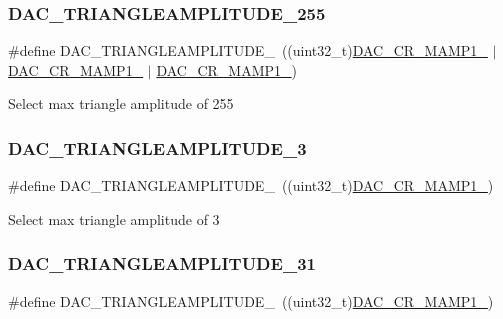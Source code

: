 \subsubsection{\texorpdfstring{DAC\_TRIANGLEAMPLITUDE\_255}{DAC\_TRIANGLEAMPLITUDE\_255}}
{\footnotesize\ttfamily \#define D\+A\+C\+\_\+\+T\+R\+I\+A\+N\+G\+L\+E\+A\+M\+P\+L\+I\+T\+U\+D\+E\+\_~((uint32\+\_\+t)\mbox{\hyperlink{group___peripheral___registers___bits___definition_ga0fefef1d798a2685b03e44bd9fdac06b}{D\+A\+C\+\_\+\+C\+R\+\_\+\+M\+A\+M\+P1\+\_}} $\vert$ \mbox{\hyperlink{group___peripheral___registers___bits___definition_ga6cc15817842cb7992d449c448684f68d}{D\+A\+C\+\_\+\+C\+R\+\_\+\+M\+A\+M\+P1\+\_}} $\vert$ \mbox{\hyperlink{group___peripheral___registers___bits___definition_ga4225dcce22b440fcd3a8ad96c5f2baec}{D\+A\+C\+\_\+\+C\+R\+\_\+\+M\+A\+M\+P1\+\_}})}

Select max triangle amplitude of 255 \mbox{\label{group___d_a_c_ex__lfsrunmask__triangleamplitude_gaa334aae5c5295ac13a5f4c0c93a95eac}} 
\subsubsection{\texorpdfstring{DAC\_TRIANGLEAMPLITUDE\_3}{DAC\_TRIANGLEAMPLITUDE\_3}}
{\footnotesize\ttfamily \#define D\+A\+C\+\_\+\+T\+R\+I\+A\+N\+G\+L\+E\+A\+M\+P\+L\+I\+T\+U\+D\+E\+\_~((uint32\+\_\+t)\mbox{\hyperlink{group___peripheral___registers___bits___definition_ga4225dcce22b440fcd3a8ad96c5f2baec}{D\+A\+C\+\_\+\+C\+R\+\_\+\+M\+A\+M\+P1\+\_}})}

Select max triangle amplitude of 3 \mbox{\label{group___d_a_c_ex__lfsrunmask__triangleamplitude_ga900e918a12aa0542e8ba9ab6fe821f53}} 
\subsubsection{\texorpdfstring{DAC\_TRIANGLEAMPLITUDE\_31}{DAC\_TRIANGLEAMPLITUDE\_31}}
{\footnotesize\ttfamily \#define D\+A\+C\+\_\+\+T\+R\+I\+A\+N\+G\+L\+E\+A\+M\+P\+L\+I\+T\+U\+D\+E\+\_~((uint32\+\_\+t)\mbox{\hyperlink{group___peripheral___registers___bits___definition_ga0fefef1d798a2685b03e44bd9fdac06b}{D\+A\+C\+\_\+\+C\+R\+\_\+\+M\+A\+M\+P1\+\_}})}

